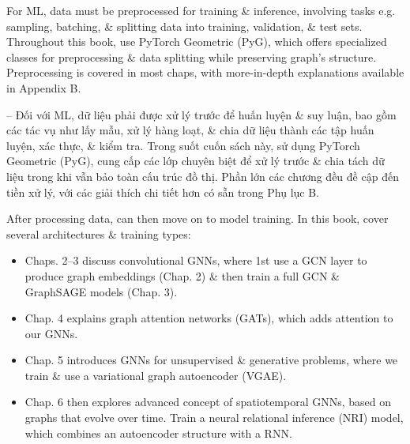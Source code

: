 \documentclass{article}
\begin{document}
\begin{itemize}
\begin{itemize}
\begin{itemize}
            For ML, data must be preprocessed for training \& inference, involving tasks e.g. sampling, batching, \& splitting data into training, validation, \& test sets. Throughout this book, use PyTorch Geometric (PyG), which offers specialized classes for preprocessing \& data splitting while preserving graph's structure. Preprocessing is covered in most chaps, with more-in-depth explanations available in Appendix B.

            -- Đối với ML, dữ liệu phải được xử lý trước để huấn luyện \& suy luận, bao gồm các tác vụ như lấy mẫu, xử lý hàng loạt, \& chia dữ liệu thành các tập huấn luyện, xác thực, \& kiểm tra. Trong suốt cuốn sách này, sử dụng PyTorch Geometric (PyG), cung cấp các lớp chuyên biệt để xử lý trước \& chia tách dữ liệu trong khi vẫn bảo toàn cấu trúc đồ thị. Phần lớn các chương đều đề cập đến tiền xử lý, với các giải thích chi tiết hơn có sẵn trong Phụ lục B.

            After processing data, can then move on to model training. In this book, cover several architectures \& training types:
            \begin{itemize}
                \item Chaps. 2--3 discuss convolutional GNNs, where 1st use a GCN layer to produce graph embeddings (Chap. 2) \& then train a full GCN \& GraphSAGE models (Chap. 3).
                \item Chap. 4 explains graph attention networks (GATs), which adds attention to our GNNs.
                \item Chap. 5 introduces GNNs for unsupervised \& generative problems, where we train \& use a variational graph autoencoder (VGAE).
                \item Chap. 6 then explores advanced concept of spatiotemporal GNNs, based on graphs that evolve over time. Train a neural relational inference (NRI) model, which combines an autoencoder structure with a RNN.


\end{itemize}
\end{itemize}
\end{itemize}
\end{itemize}
\end{document}
